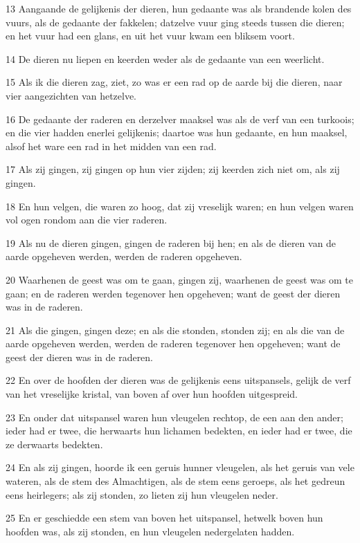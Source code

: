 \par 13 Aangaande de gelijkenis der dieren, hun gedaante was als brandende kolen des vuurs, als de gedaante der fakkelen; datzelve vuur ging steeds tussen die dieren; en het vuur had een glans, en uit het vuur kwam een bliksem voort.
\par 14 De dieren nu liepen en keerden weder als de gedaante van een weerlicht.
\par 15 Als ik die dieren zag, ziet, zo was er een rad op de aarde bij die dieren, naar vier aangezichten van hetzelve.
\par 16 De gedaante der raderen en derzelver maaksel was als de verf van een turkoois; en die vier hadden enerlei gelijkenis; daartoe was hun gedaante, en hun maaksel, alsof het ware een rad in het midden van een rad.
\par 17 Als zij gingen, zij gingen op hun vier zijden; zij keerden zich niet om, als zij gingen.
\par 18 En hun velgen, die waren zo hoog, dat zij vreselijk waren; en hun velgen waren vol ogen rondom aan die vier raderen.
\par 19 Als nu de dieren gingen, gingen de raderen bij hen; en als de dieren van de aarde opgeheven werden, werden de raderen opgeheven.
\par 20 Waarhenen de geest was om te gaan, gingen zij, waarhenen de geest was om te gaan; en de raderen werden tegenover hen opgeheven; want de geest der dieren was in de raderen.
\par 21 Als die gingen, gingen deze; en als die stonden, stonden zij; en als die van de aarde opgeheven werden, werden de raderen tegenover hen opgeheven; want de geest der dieren was in de raderen.
\par 22 En over de hoofden der dieren was de gelijkenis eens uitspansels, gelijk de verf van het vreselijke kristal, van boven af over hun hoofden uitgespreid.
\par 23 En onder dat uitspansel waren hun vleugelen rechtop, de een aan den ander; ieder had er twee, die herwaarts hun lichamen bedekten, en ieder had er twee, die ze derwaarts bedekten.
\par 24 En als zij gingen, hoorde ik een geruis hunner vleugelen, als het geruis van vele wateren, als de stem des Almachtigen, als de stem eens geroeps, als het gedreun eens heirlegers; als zij stonden, zo lieten zij hun vleugelen neder.
\par 25 En er geschiedde een stem van boven het uitspansel, hetwelk boven hun hoofden was, als zij stonden, en hun vleugelen nedergelaten hadden.
